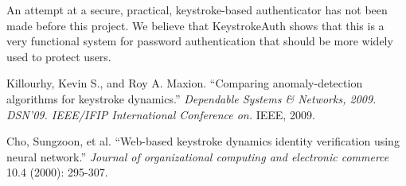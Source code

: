 \documentclass{article}
\begin{document}
An attempt at a secure, practical, keystroke-based authenticator has not been made before this project. We believe that KeystrokeAuth shows that this is a very functional system for password authentication that should be more widely used to protect users.


\begin{thebibliography}{99}
   Killourhy, Kevin S., and Roy A. Maxion. 
   ``Comparing anomaly-detection algorithms for keystroke dynamics.''
   \textit{Dependable Systems \& Networks, 2009. DSN'09. IEEE/IFIP International Conference on.}
   IEEE, 2009. 
 
   Cho, Sungzoon, et al.
   ``Web-based keystroke dynamics identity verification using neural network.'' 
   \textit{Journal of organizational computing and electronic commerce}
   10.4 (2000): 295-307.
  
\end{thebibliography}
\end{document}

